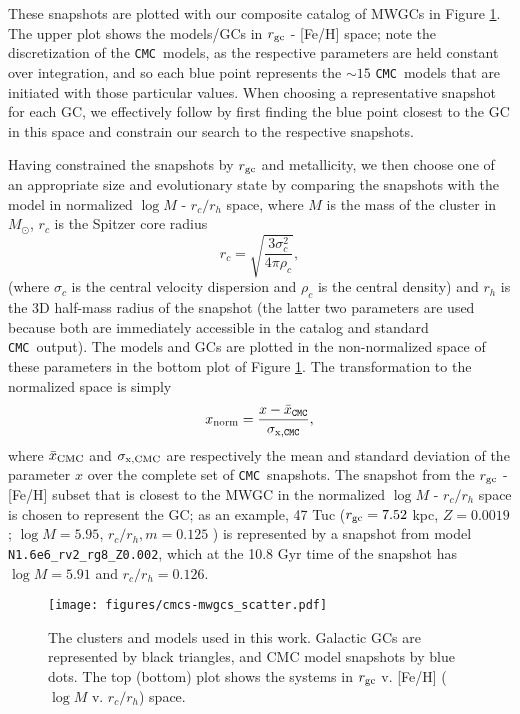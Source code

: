 \documentclass[twocolumn,linenumbers]{aastex631}
\newcommand{\CMC}{\texttt{CMC}}
\begin{document}
These snapshots are plotted with our composite catalog of MWGCs in Figure \ref{fig:cmcs-mwgcs_scatter}.
The upper plot shows the models/GCs in $r_{\rm gc}$ - [Fe/H] space; note the discretization of the \CMC\ models, as the respective parameters are held constant over integration, and so each blue point represents the $\sim 15$ \CMC\ models that are initiated with those particular values.
When choosing a representative snapshot for each GC, we effectively follow \citet{2021ApJ...912..102R} by first finding the blue point closest to the GC in this space and constrain our search to the respective snapshots.

Having constrained the snapshots by $r_{\rm gc}$ and metallicity, we then choose one of an appropriate size and evolutionary state by comparing the snapshots with the model in normalized $\log M$ - $r_c / r_h$ space, where $M$ is the mass of the cluster in $M_\odot$, $r_c$ is the Spitzer core radius \citep{1987degc.book.....S}
\begin{equation}
    r_c = \sqrt{\frac{3 \sigma_c^2}{4 \pi \rho_c}},
\end{equation}
(where $\sigma_c$ is the central velocity dispersion and $\rho_c$ is the central density) and $r_h$ is the 3D half-mass radius of the snapshot (the latter two parameters are used because both are immediately accessible in the \citet{2018MNRAS.478.1520B} catalog and standard \CMC\ output).
The models and GCs are plotted in the non-normalized space of these parameters in the bottom plot of Figure \ref{fig:cmcs-mwgcs_scatter}.
The transformation to the normalized space is simply
\begin{equation}
    x_{\rm norm} = \frac{x - \bar{x}_{\rm \CMC}}{\sigma_{\rm x, \CMC}},
\end{equation}
where $\bar{x}_{\rm CMC}$ and $\sigma_{\rm x,CMC}$ are respectively the mean and standard deviation of the parameter $x$ over the complete set of \CMC\ snapshots.
The snapshot from the $r_{\rm gc}$ - [Fe/H] subset that is closest to the MWGC in the normalized $\log M$ - $r_c / r_h$ space is chosen to represent the GC; as an example, 47 Tuc ($r_{\rm gc} = 7.52$ kpc, $Z = 0.0019$; $\log M = 5.95$, $r_c / r_h,m = 0.125$ \citep{2018MNRAS.478.1520B, 2010arXiv1012.3224H}) is represented by a snapshot from model \texttt{N1.6e6\_rv2\_rg8\_Z0.002}, which at the 10.8 Gyr time of the snapshot has $\log M = 5.91$ and $r_c / r_h = 0.126$.

\begin{figure}
    \begin{centering}
        \texttt{[image: figures/cmcs-mwgcs\_scatter.pdf]}
        \caption{
        The clusters and models used in this work.
        Galactic GCs are represented by black triangles, and CMC model snapshots by blue dots.
        The top (bottom) plot shows the systems in $r_{\rm gc}$ v. [Fe/H] ($\log M$ v. $r_c / r_h$) space.
        }
        \label{fig:cmcs-mwgcs_scatter}
    \end{centering}
\end{figure}
\end{document}
